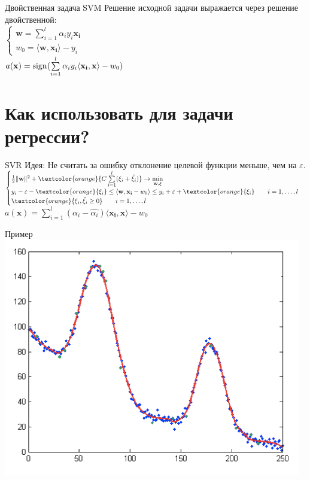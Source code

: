 \documentclass[10pt]{beamer}
\begin{document}
\begin{frame}{Двойственная задача SVM}
	Решение исходной задачи выражается через решение двойственной:\\
	$\begin{cases}
	\mathbf{w} = \sum\limits_{i = 1}^l \alpha_iy_i\mathbf{x_i}\\
	w_0 = \langle \mathbf{w}, \mathbf{x_i} \rangle - y_i
	\end{cases}$\\
	\bigbreak
	\pause
	$a(\mathbf{x}) = \operatorname{sign}(\sum\limits_{i=1}^l \alpha_iy_i \langle \mathbf{x_i}, \mathbf{x} \rangle - w_0)$
\end{frame}

\section{Как использовать для задачи регрессии?}

\begin{frame}{SVR}
  \alert{Идея}: Не считать за ошибку отклонение целевой функции меньше, чем на $\varepsilon$.
  \bigbreak
  \pause
  $\begin{cases}
		{\frac{1}{2}\Vert \mathbf{w} \Vert^2 + \textcolor{orange}{C \sum\limits_{i=1}^l (\xi_i + \hat{\xi_i}) } \rightarrow \min\limits_{\mathbf{w}, \xi}}\\
		y_i - \varepsilon - \textcolor{orange}{\xi_i} \leq \langle \mathbf{w}, \mathbf{x_i} - w_0 \rangle \leq y_i + \varepsilon + \textcolor{orange}{\xi_i} \qquad i = 1, \dots, l\\
		\textcolor{orange}{\xi_i, \hat{\xi_i} \geq 0} \qquad i = 1, \dots, l
	\end{cases}$\\
	\bigbreak
  \pause
  $a(\mathbf{x}) = \sum\limits_{i=1}^l (\alpha_i - \hat{\alpha_i}) \langle \mathbf{x_i}, \mathbf{x} \rangle - w_0$
\end{frame}

\begin{frame}{Пример}
  \centering
  \includegraphics[width=0.9 \textwidth, keepaspectratio]{images/svr1}
\end{frame}
\end{document}
